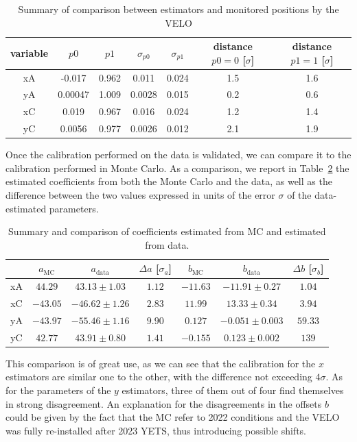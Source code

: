\begin{table}
    \centering
    \begin{tabular}{c|c|c|c|c|c|c}
    variable  & $p0$ & $p1$ & $\sigma_{p0}$ & $\sigma_{p1}$ & distance $p0=0$ [$\sigma$] & distance $p1=1$ [$\sigma$]\\
    \hline
       xA  & -0.017 & 0.962 & 0.011 & 0.024 & 1.5 & 1.6\\
       yA  & 0.00047 & 1.009 & 0.0028 & 0.015 & 0.2 & 0.6 \\
       xC & 0.019 & 0.967 & 0.016 & 0.024 & 1.2 & 1.4\\
       yC & 0.0056 & 0.977 & 0.0026 & 0.012 & 2.1 & 1.9
    \end{tabular}
    \caption{Summary of comparison between estimators and monitored positions by the VELO}
    \label{tab:summary_velo}
\end{table}

Once the calibration performed on the data is validated, we can compare it to the calibration performed in Monte Carlo. As a comparison, we report in Table~\ref{tab:comparison_coeff} the estimated coefficients from both the Monte Carlo and the data, as well as the difference  between the two values expressed in units of the error $\sigma$ of the data-estimated parameters.

\begin{table}
\centering
\begin{tabular}{
c |
c |
c |
c |
c |
c |
c }
 & $a_{\text{MC}}$ & $a_{\text{data}}$ &  $\Delta a$ [$\sigma_a$] & $b_{\text{MC}}$ &  $b_{\text{data}}$ &  $\Delta b$ [$\sigma_b$] \\ \hline
    { xA} &
  { $44.29$} &
  { $43.13\pm1.03$} &
  $1.12$ &%
  { $-11.63$} &
  { $-11.91\pm0.27$} &
  $1.04$\\%
    { xC} &
  { $-43.05$} &
  { $-46.62\pm1.26$} &
  $2.83$&%
  { $11.99 $} &
  { $13.33\pm0.34$} &
  $3.94$\\%
    { yA} &
  { $-43.97$} &
  { $-55.46\pm 1.16$} &
  $9.90$ &%
  { $0.127 $} &
  { $-0.051\pm0.003$} &
  $59.33$\\%
    { yC} &
  { $42.77 $} &
  { $43.91\pm0.80 $} &
  $1.41$&%
  { $-0.155$} &
  { $0.123\pm0.002 $} &
  $139$%
\end{tabular}
\caption{Summary and comparison of coefficients estimated from MC and estimated from data. }\label{tab:comparison_coeff}
\end{table}
This comparison is of great use, as we can see that the calibration for the $x$ estimators are similar one to the other, with the difference not exceeding $4\sigma$. As for the parameters of the $y$ estimators, three of them out of four find themselves in strong disagreement. An explanation for the disagreements in the offsets $b$ could be given by the fact that the MC refer to 2022 conditions and the VELO was fully re-installed after 2023 YETS, thus introducing possible shifts. 


